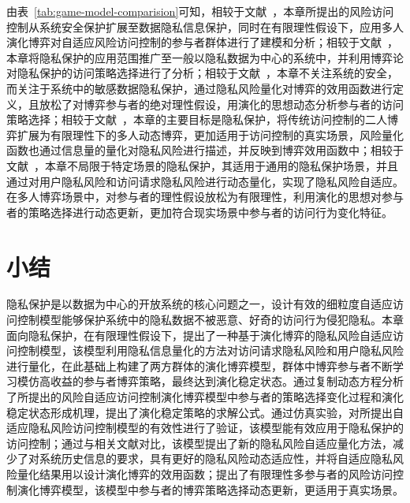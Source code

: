由表~\ref{tab:game-model-comparision}可知，相较于文献~\cite{ni2010risk,shaikh2012dynamic,santos2016framework}，本章所提出的风险访问控制从系统安全保护扩展至数据隐私信息保护，同时在有限理性假设下，应用多人演化博弈对自适应风险访问控制的参与者群体进行了建模和分析；相较于文献~\cite{wang2011quantified,zhang2018privacy}，本章将隐私保护的应用范围推广至一般以隐私数据为中心的系统中，并利用博弈论对隐私保护的访问策略选择进行了分析；相较于文献~\cite{gao2018game,liu2016dynamic}，本章不关注系统的安全，而关注于系统中的敏感数据隐私保护，通过隐私风险量化对博弈的效用函数进行定义，且放松了对博弈参与者的绝对理性假设，用演化的思想动态分析参与者的访问策略选择；相较于文献~\cite{helil2017non}，本章的主要目标是隐私保护，将传统访问控制的二人博弈扩展为有限理性下的多人动态博弈，更加适用于访问控制的真实场景，风险量化函数也通过信息量的量化对隐私风险进行描述，并反映到博弈效用函数中；相较于文献~\cite{hu2014game}，本章不局限于特定场景的隐私保护，其适用于通用的隐私保护场景，并且通过对用户隐私风险和访问请求隐私风险进行动态量化，实现了隐私风险自适应。在多人博弈场景中，对参与者的理性假设放松为有限理性，利用演化的思想对参与者的策略选择进行动态更新，更加符合现实场景中参与者的访问行为变化特征。
 \section{小结}
隐私保护是以数据为中心的开放系统的核心问题之一，设计有效的细粒度自适应访问控制模型能够保护系统中的隐私数据不被恶意、好奇的访问行为侵犯隐私。本章面向隐私保护，在有限理性假设下，提出了一种基于演化博弈的隐私风险自适应访问控制模型，该模型利用隐私信息量化的方法对访问请求隐私风险和用户隐私风险进行量化，在此基础上构建了两方群体的演化博弈模型，群体中博弈参与者不断学习模仿高收益的参与者博弈策略，最终达到演化稳定状态。通过复制动态方程分析了所提出的风险自适应访问控制演化博弈模型中参与者的策略选择变化过程和演化稳定状态形成机理，提出了演化稳定策略的求解公式。通过仿真实验，对所提出自适应隐私风险访问控制模型的有效性进行了验证，该模型能有效应用于隐私保护的访问控制；通过与相关文献对比，该模型提出了新的隐私风险自适应量化方法，减少了对系统历史信息的要求，具有更好的隐私风险动态适应性，并将自适应隐私风险量化结果用以设计演化博弈的效用函数；提出了有限理性多参与者的风险访问控制演化博弈模型，该模型中参与者的博弈策略选择动态更新，更适用于真实场景。